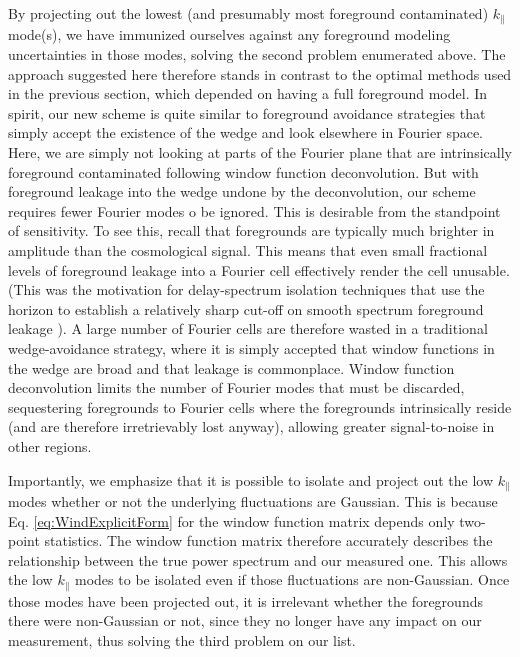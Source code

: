 \documentclass[twocolumn,aps,prd,nofootinbib,showpacs]{revtex4-1}
\begin{document}
By projecting out the lowest (and presumably most foreground contaminated) $k_\parallel$ mode(s), we have immunized ourselves against any foreground modeling uncertainties in those modes, solving the second problem enumerated above.  The approach suggested here therefore stands in contrast to the optimal methods used in the previous section, which depended on having a full foreground model.  In spirit, our new scheme is quite similar to foreground avoidance strategies that simply accept the existence of the wedge and look elsewhere in Fourier space.  Here, we are simply not looking at parts of the Fourier plane that are intrinsically foreground contaminated following window function deconvolution.  But with foreground leakage into the wedge undone by the deconvolution, our scheme requires fewer Fourier modes o be ignored.  This is desirable from the standpoint of sensitivity.  To see this, recall that foregrounds are typically much brighter in amplitude than the cosmological signal.  This means that even small fractional levels of foreground leakage into a Fourier cell effectively render the cell unusable.  (This was the motivation for delay-spectrum isolation techniques that use the horizon to establish a relatively sharp cut-off on smooth spectrum foreground leakage \cite{Parsons2012b,Parsons2013}).  A large number of Fourier cells are therefore wasted in a traditional wedge-avoidance strategy, where it is simply accepted that window functions in the wedge are broad and that leakage is commonplace.  Window function deconvolution limits the number of Fourier modes that must be discarded, sequestering foregrounds to Fourier cells where the foregrounds intrinsically reside (and are therefore irretrievably lost anyway), allowing greater signal-to-noise in other regions.

Importantly, we emphasize that it is possible to isolate and project out the low $k_\parallel$ modes whether or not the underlying fluctuations are Gaussian.  This is because Eq. \eqref{eq:WindExplicitForm} for the window function matrix depends only two-point statistics.  The window function matrix therefore accurately describes the relationship between the true power spectrum and our measured one.  This allows the low $k_\parallel$ modes to be isolated even if those fluctuations are non-Gaussian.  Once those modes have been projected out, it is irrelevant whether the foregrounds there were non-Gaussian or not, since they no longer have any impact on our measurement, thus solving the third problem on our list.
\end{document}
